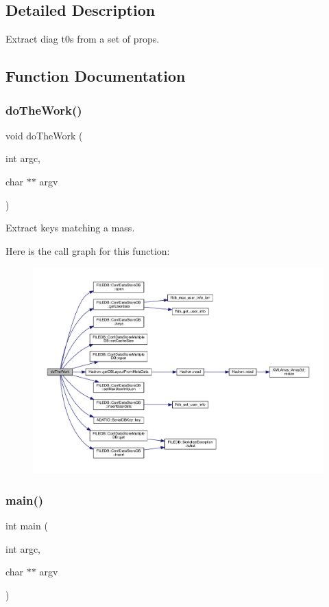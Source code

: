 \subsection{Detailed Description}
Extract diag t0\textquotesingle{}s from a set of props. 



\subsection{Function Documentation}
\mbox{\label{adat-devel_2main_2dbutil_2dbprop__diag__t0_8cc_afab297cac5e1521133f2d08cd751ef3d}} 
\subsubsection{\texorpdfstring{doTheWork()}{doTheWork()}}
{\footnotesize\ttfamily void do\+The\+Work (\begin{DoxyParamCaption}\item[{int}]{argc,  }\item[{char $\ast$$\ast$}]{argv }\end{DoxyParamCaption})}



Extract keys matching a mass. 

Here is the call graph for this function\+:
\nopagebreak
\begin{figure}[H]
\begin{center}
\leavevmode
\includegraphics[width=350pt]{d9/dbd/adat-devel_2main_2dbutil_2dbprop__diag__t0_8cc_afab297cac5e1521133f2d08cd751ef3d_cgraph}
\end{center}
\end{figure}
\mbox{\label{adat-devel_2main_2dbutil_2dbprop__diag__t0_8cc_a3c04138a5bfe5d72780bb7e82a18e627}} 
\subsubsection{\texorpdfstring{main()}{main()}}
{\footnotesize\ttfamily int main (\begin{DoxyParamCaption}\item[{int}]{argc,  }\item[{char $\ast$$\ast$}]{argv }\end{DoxyParamCaption})}

